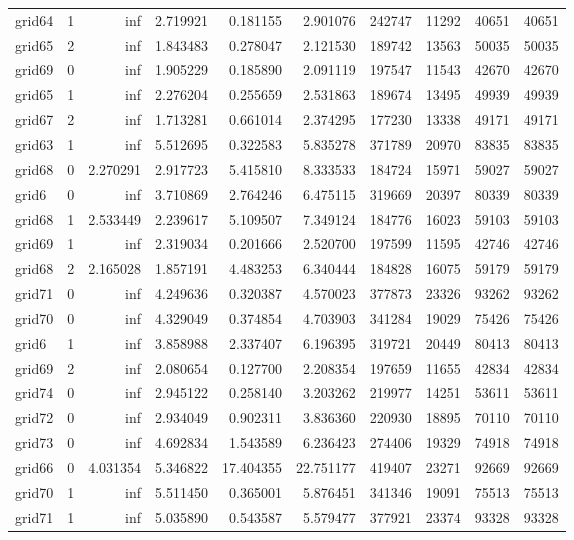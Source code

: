 \begin{longtable}{|l|r|r|r|r|r|r|r|r|r|}
grid64 & 1 & inf & 2.719921 & 0.181155 & 2.901076 & 242747 & 11292 & 40651 & 40651 \\
grid65 & 2 & inf & 1.843483 & 0.278047 & 2.121530 & 189742 & 13563 & 50035 & 50035 \\
grid69 & 0 & inf & 1.905229 & 0.185890 & 2.091119 & 197547 & 11543 & 42670 & 42670 \\
grid65 & 1 & inf & 2.276204 & 0.255659 & 2.531863 & 189674 & 13495 & 49939 & 49939 \\
grid67 & 2 & inf & 1.713281 & 0.661014 & 2.374295 & 177230 & 13338 & 49171 & 49171 \\
grid63 & 1 & inf & 5.512695 & 0.322583 & 5.835278 & 371789 & 20970 & 83835 & 83835 \\
grid68 & 0 & 2.270291 & 2.917723 & 5.415810 & 8.333533 & 184724 & 15971 & 59027 & 59027 \\
grid6 & 0 & inf & 3.710869 & 2.764246 & 6.475115 & 319669 & 20397 & 80339 & 80339 \\
grid68 & 1 & 2.533449 & 2.239617 & 5.109507 & 7.349124 & 184776 & 16023 & 59103 & 59103 \\
grid69 & 1 & inf & 2.319034 & 0.201666 & 2.520700 & 197599 & 11595 & 42746 & 42746 \\
grid68 & 2 & 2.165028 & 1.857191 & 4.483253 & 6.340444 & 184828 & 16075 & 59179 & 59179 \\
grid71 & 0 & inf & 4.249636 & 0.320387 & 4.570023 & 377873 & 23326 & 93262 & 93262 \\
grid70 & 0 & inf & 4.329049 & 0.374854 & 4.703903 & 341284 & 19029 & 75426 & 75426 \\
grid6 & 1 & inf & 3.858988 & 2.337407 & 6.196395 & 319721 & 20449 & 80413 & 80413 \\
grid69 & 2 & inf & 2.080654 & 0.127700 & 2.208354 & 197659 & 11655 & 42834 & 42834 \\
grid74 & 0 & inf & 2.945122 & 0.258140 & 3.203262 & 219977 & 14251 & 53611 & 53611 \\
grid72 & 0 & inf & 2.934049 & 0.902311 & 3.836360 & 220930 & 18895 & 70110 & 70110 \\
grid73 & 0 & inf & 4.692834 & 1.543589 & 6.236423 & 274406 & 19329 & 74918 & 74918 \\
grid66 & 0 & 4.031354 & 5.346822 & 17.404355 & 22.751177 & 419407 & 23271 & 92669 & 92669 \\
grid70 & 1 & inf & 5.511450 & 0.365001 & 5.876451 & 341346 & 19091 & 75513 & 75513 \\
grid71 & 1 & inf & 5.035890 & 0.543587 & 5.579477 & 377921 & 23374 & 93328 & 93328 \\

\end{longtable}

